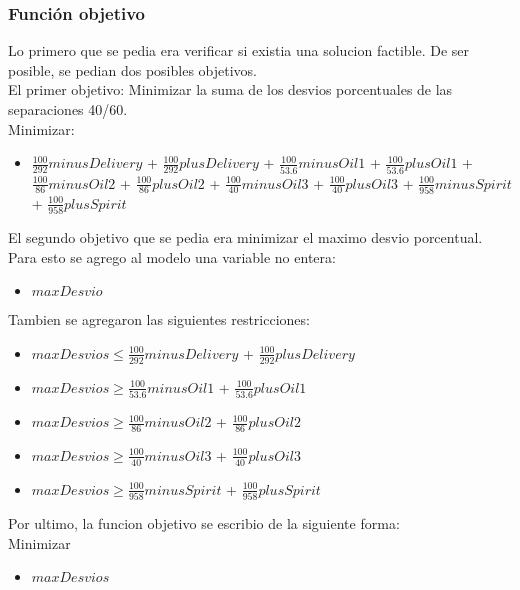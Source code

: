 \subsubsection{Funci\'on objetivo}
Lo primero que se pedia era verificar si existia una solucion factible. De ser posible, se pedian dos posibles objetivos.\\
El primer objetivo: Minimizar la suma de los desvios porcentuales de las separaciones 40/60.\\

Minimizar: \\
\begin{itemize}
\item $\frac{100}{292} minusDelivery$ + $\frac{100}{292} plusDelivery$ + $\frac{100}{53.6} minusOil1$ + $\frac{100}{53.6} plusOil1$ + $\frac{100}{86} minusOil2$ + $\frac{100}{86} plusOil2$ + $\frac{100}{40} minusOil3$ + $\frac{100}{40} plusOil3$ + $\frac{100}{958} minusSpirit$ + $\frac{100}{958} plusSpirit$
\end{itemize}
El segundo objetivo que se pedia era minimizar el maximo desvio porcentual.
Para esto se agrego al modelo una variable no entera: \\
\begin{itemize}
\item $maxDesvio$ \\
\end{itemize}

Tambien se agregaron las siguientes restricciones: \\

\begin{itemize}
\item $maxDesvios \leq \frac{100}{292} minusDelivery$ + $\frac{100}{292} plusDelivery$
\item $maxDesvios \geq \frac{100}{53.6} minusOil1$ + $\frac{100}{53.6} plusOil1$
\item $maxDesvios \geq  \frac{100}{86} minusOil2$ + $\frac{100}{86} plusOil2$
\item $maxDesvios \geq \frac{100}{40} minusOil3$ + $\frac{100}{40} plusOil3$
\item $maxDesvios \geq \frac{100}{958} minusSpirit$ + $\frac{100}{958} plusSpirit$
\end{itemize}
 Por ultimo, la funcion objetivo se escribio de la siguiente forma: \\

 Minimizar
 \begin{itemize}
 \item $maxDesvios$
\end{itemize}
\newpage
